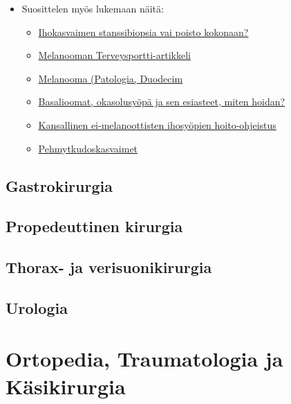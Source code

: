\documentclass[
]{book}
\providecommand{\tightlist}{%
  \setlength{\itemsep}{0pt}\setlength{\parskip}{0pt}}
\begin{document}
\begin{itemize}
\item
  Suosittelen myös lukemaan näitä:

  \begin{itemize}
  \tightlist
  \item
    \href{https://www.terveysportti.fi/apps/dtk/ltk/article/duo18406/}{Ihokasvaimen stanssibiopsia vai poisto kokonaan?}
  \item
    \href{https://www.terveysportti.fi/apps/dtk/ltk/article/ykt01386/}{Melanooman Terveysportti-artikkeli}
  \item
    \href{https://www.oppiportti.fi/oppikirjat/pat00688}{Melanooma (Patologia, Duodecim}
  \item
    \href{https://www.terveysportti.fi/apps/dtk/ltk/article/duo11556/}{Basalioomat, okasolusyöpä ja sen esiasteet, miten hoidan?}
  \item
    \href{https://www.terveysportti.fi/apps/dtk/ltk/article/hsu00009}{Kansallinen ei-melanoottisten ihosyöpien hoito-ohjeistus}
  \item
    \href{https://www.oppiportti.fi/oppikirjat/pat00763}{Pehmytkudoskasvaimet}
  \end{itemize}
\end{itemize}

\section{Gastrokirurgia}\label{gastrokirurgia}

\section{Propedeuttinen kirurgia}\label{propedeuttinen-kirurgia}

\section{Thorax- ja verisuonikirurgia}\label{thorax--ja-verisuonikirurgia}

\section{Urologia}\label{urologia}

\chapter{Ortopedia, Traumatologia ja Käsikirurgia}\label{OrtoTraumaKasi}
\end{document}
